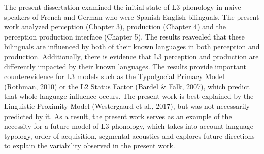 The present dissertation examined the initial state of L3 phonology in naive speakers of French and German who were Spanish-English bilinguals.
The present work analyzed perception (Chapter 3), production (Chapter 4) and the perception production interface (Chapter 5).
The results reavealed that these bilinguals are influenced by both of their known languages in both perception and production.
Additionally, there is evidence that L3 perception and production are differently impacted by their known languages. The results provide important counterevidence for L3 models such as the Typolgocial Primacy Model (Rothman, 2010) or the L2 Status Factor (Bardel \& Falk, 2007), which predict that whole-language influence occurs. The present work is best explained by the Linguistic Proximity Model (Westergaard et al., 2017), but was not necessarily predicted by it.
As a result, the present work serves as an example of the necessity for a future model of L3 phonology, which takes into account language typology, order of acquisition, segmental acoustics and explores future directions to explain the variability observed in the present work. 

